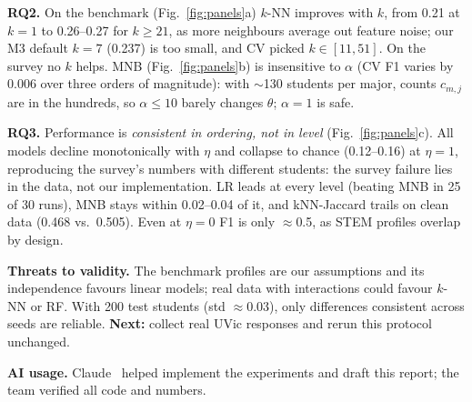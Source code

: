 \documentclass[sigconf]{acmart}
\newcommand{\RQ}[1]{\textbf{RQ#1}}
\begin{document}
\textbf{\RQ2.} On the benchmark (Fig.~\ref{fig:panels}a) $k$-NN improves with $k$, from 0.21 at $k{=}1$ to 0.26--0.27 for $k{\ge}21$, as more neighbours average out feature noise; our M3 default $k{=}7$ (0.237) is too small, and CV picked $k\in[11,51]$. On the survey no $k$ helps. MNB (Fig.~\ref{fig:panels}b) is insensitive to $\alpha$ (CV F1 varies by 0.006 over three orders of magnitude): with $\sim$130 students per major, counts $c_{m,j}$ are in the hundreds, so $\alpha{\le}10$ barely changes $\theta$; $\alpha{=}1$ is safe.

\textbf{\RQ3.} Performance is \emph{consistent in ordering, not in level} (Fig.~\ref{fig:panels}c). All models decline monotonically with $\eta$ and collapse to chance (0.12--0.16) at $\eta{=}1$, reproducing the survey's numbers with different students: the survey failure lies in the data, not our implementation. LR leads at every level (beating MNB in 25 of 30 runs), MNB stays within 0.02--0.04 of it, and kNN-Jaccard trails on clean data (0.468 vs.\ 0.505). Even at $\eta{=}0$ F1 is only $\approx$0.5, as STEM profiles overlap by design.

\textbf{Threats to validity.} The benchmark profiles are our assumptions and its independence favours linear models; real data with interactions could favour $k$-NN or RF. With 200 test students (std $\approx$0.03), only differences consistent across seeds are reliable. \textbf{Next:} collect real UVic responses and rerun this protocol unchanged.

\textbf{AI usage.} Claude~\cite{claude2026} helped implement the experiments and draft this report; the team verified all code and numbers.



\end{document}
